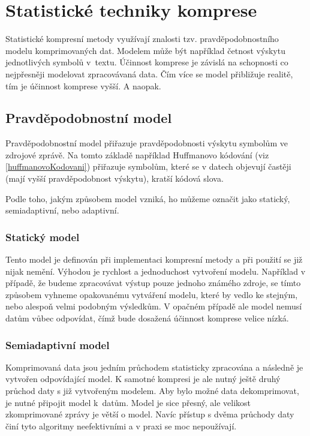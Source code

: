 \chapter{Statistické techniky komprese}
\label{kapitolaStatistickaKomprese}
Statistické kompresní metody využívají znalosti tzv. pravděpodobnostního modelu komprimovaných dat. Modelem může být například četnost výskytu jednotlivých symbolů v~textu. Účinnost komprese je závislá na schopnosti co nejpřesněji modelovat zpracovávaná data. Čím více se model přibližuje realitě, tím je účinnost komprese vyšší. A naopak.

\section{Pravděpodobnostní model}
\label{pravdepodobnostniModel}
Pravděpodobnostní model přiřazuje pravděpodobnosti výskytu symbolům ve zdrojové zprávě. Na tomto základě například Huffmanovo kódování (viz \ref{huffmanovoKodovani}) přiřazuje symbolům, které se v datech objevují častěji (mají vyšší pravděpodobnost výskytu), kratší kódová slova.

Podle toho, jakým způsobem model vzniká, ho můžeme označit jako statický, semiadaptivní, nebo adaptivní.

\subsection{Statický model}
Tento model je definován při implementaci kompresní metody a při použití se již nijak nemění. Výhodou je rychlost a jednoduchost vytvoření modelu. Například v případě, že budeme zpracovávat výstup pouze jednoho známého zdroje, se tímto způsobem vyhneme opakovanému vytváření modelu, které by vedlo ke stejným, nebo alespoň velmi podobným výsledkům. V opačném případě ale model nemusí datům vůbec odpovídat, čímž bude dosažená účinnost komprese velice nízká.

\subsection{Semiadaptivní model}
Komprimovaná data jsou jedním průchodem statisticky zpracována a následně je vytvořen odpovídající model. K samotné kompresi je ale nutný ještě druhý průchod daty s již vytvořeným modelem. Aby bylo možné data dekomprimovat, je nutné připojit model k~datům. Model je sice přesný, ale velikost zkomprimované zprávy je větší o model. Navíc přístup s dvěma průchody daty činí tyto algoritmy neefektivními a v praxi se moc nepoužívají.

